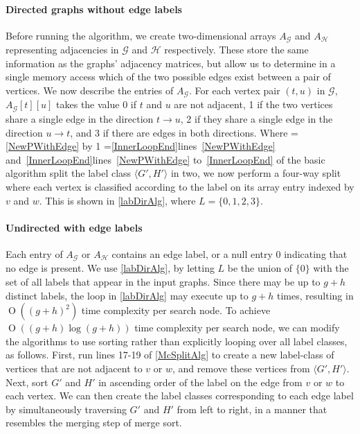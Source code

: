 \documentclass[letterpaper]{article}
\newcommand{\graphG}{\mathcal{G}}
\newcommand{\graphH}{\mathcal{H}}
\newcommand{\setG}{G}
\newcommand{\setH}{H}
\newcommand{\linerangeref}[2]{\count255=\ref{#1}\advance\count255 by 1 \ifnum\count255=\ref{#2}lines~\ref{#1} and~\ref{#2}\else lines~\ref{#1} to~\ref{#2}\fi}
\newcommand{\BigO}[1]{\ensuremath{\operatorname{O}\left(#1\right)}}
\begin{document}
\paragraph{Directed graphs without edge labels} Before running the algorithm,
we create two-dimensional arrays $A_\graphG$ and $A_\graphH$ representing adjacencies in
$\graphG$ and $\graphH$ respectively.  These store the same information as the graphs'
adjacency matrices, but allow us to determine in a single memory access which of
the two possible edges exist between a pair of vertices.
We now describe the entries of $A_\graphG$.
For each vertex pair $(t,u)$ in $\graphG$,
$A_\graphG[t][u]$ takes the value 0 if $t$ and $u$ are not
adjacent, 1 if the two vertices share a single edge in the direction $t
\rightarrow u$, 2 if they share a single edge in the direction $u \rightarrow
t$, and 3 if there are edges in both directions. Where
\linerangeref{NewPWithEdge}{InnerLoopEnd} of the basic algorithm split the
label class $\langle \setG',\setH' \rangle$ in two, we now perform a four-way split
where each vertex is classified according to the label on its array entry indexed by
$v$ and $w$.  This is shown in \cref{labDirAlg}, where
$L=\{0,1,2,3\}$.

\paragraph{Undirected with edge labels} Each entry of $A_\graphG$ or $A_\graphH$ contains an
edge label, or a null entry $0$ indicating that no edge is present.  We use \cref{labDirAlg}, by
letting $L$ be the union of $\{0\}$ with the set of all labels that appear in
the input graphs. Since there may be up to $g + h$ distinct labels, the loop in
\cref{labDirAlg} may execute up to $g + h$ times, resulting in $\BigO{(g+h)^2}$
time complexity per search node.  To achieve $\BigO{(g+h) \log (g+h)}$ time
complexity per search node, we can modify the algorithms to use sorting rather
than explicitly looping over all label classes, as follows.  First, run lines
17-19 of \cref{McSplitAlg} to create a new label-class of vertices that are
not adjacent to $v$ or $w$, and remove these vertices from $\langle \setG',\setH'
\rangle$.  Next, sort $\setG'$ and $\setH'$ in ascending order of the label on the edge
from $v$ or $w$ to each vertex. We can then create the label classes
corresponding to each edge label by simultaneously traversing $\setG'$ and $\setH'$
from left to right, in a manner that resembles the merging step of merge sort.
\end{document}
